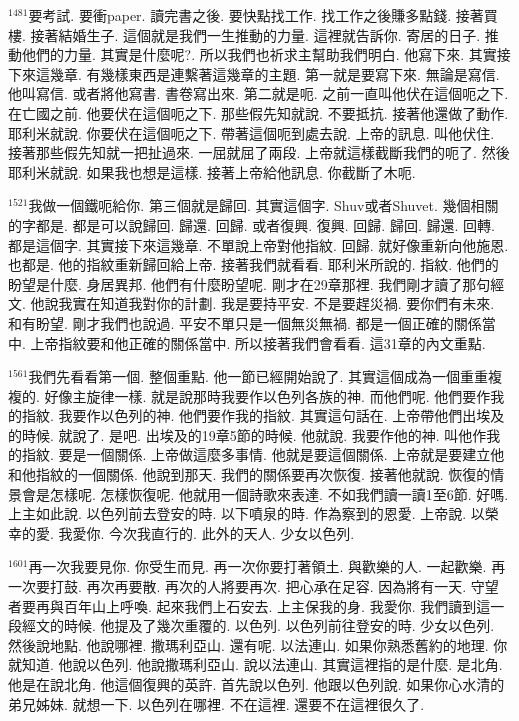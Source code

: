 \documentclass{book}
\begin{document}
$^{1481}$要考試.
要衝paper.
讀完書之後.
要快點找工作.
找工作之後賺多點錢.
接著買樓.
接著結婚生子.
這個就是我們一生推動的力量.
這裡就告訴你.
寄居的日子.
推動他們的力量.
其實是什麼呢?.
所以我們也祈求主幫助我們明白.
他寫下來.
其實接下來這幾章.
有幾樣東西是連繫著這幾章的主題.
第一就是要寫下來.
無論是寫信.
他叫寫信.
或者將他寫書.
書卷寫出來.
第二就是呃.
之前一直叫他伏在這個呃之下.
在亡國之前.
他要伏在這個呃之下.
那些假先知就說.
不要抵抗.
接著他還做了動作.
耶利米就說.
你要伏在這個呃之下.
帶著這個呃到處去說.
上帝的訊息.
叫他伏住.
接著那些假先知就一把扯過來.
一屈就屈了兩段.
上帝就這樣截斷我們的呃了.
然後耶利米就說.
如果我也想是這樣.
接著上帝給他訊息.
你截斷了木呃.

$^{1521}$我做一個鐵呃給你.
第三個就是歸回.
其實這個字.
Shuv或者Shuvet.
幾個相關的字都是.
都是可以說歸回.
歸還.
回歸.
或者復興.
復興.
回歸.
歸回.
歸還.
回轉.
都是這個字.
其實接下來這幾章.
不單說上帝對他指紋.
回歸.
就好像重新向他施恩.
也都是.
他的指紋重新歸回給上帝.
接著我們就看看.
耶利米所說的.
指紋.
他們的盼望是什麼.
身居異邦.
他們有什麼盼望呢.
剛才在29章那裡.
我們剛才讀了那句經文.
他說我實在知道我對你的計劃.
我是要持平安.
不是要趕災禍.
要你們有未來.
和有盼望.
剛才我們也說過.
平安不單只是一個無災無禍.
都是一個正確的關係當中.
上帝指紋要和他正確的關係當中.
所以接著我們會看看.
這31章的內文重點.

$^{1561}$我們先看看第一個.
整個重點.
他一節已經開始說了.
其實這個成為一個重重複複的.
好像主旋律一樣.
就是說那時我要作以色列各族的神.
而他們呢.
他們要作我的指紋.
我要作以色列的神.
他們要作我的指紋.
其實這句話在.
上帝帶他們出埃及的時候.
就說了.
是吧.
出埃及的19章5節的時候.
他就說.
我要作他的神.
叫他作我的指紋.
要是一個關係.
上帝做這麼多事情.
他就是要這個關係.
上帝就是要建立他和他指紋的一個關係.
他說到那天.
我們的關係要再次恢復.
接著他就說.
恢復的情景會是怎樣呢.
怎樣恢復呢.
他就用一個詩歌來表達.
不如我們讀一讀1至6節.
好嗎.
上主如此說.
以色列前去登安的時.
以下噴泉的時.
作為察到的恩愛.
上帝說.
以榮幸的愛.
我愛你.
今次我直行的.
此外的天人.
少女以色列.

$^{1601}$再一次我要見你.
你受生而見.
再一次你要打著領土.
與歡樂的人.
一起歡樂.
再一次要打鼓.
再次再要散.
再次的人將要再次.
把心承在足容.
因為將有一天.
守望者要再與百年山上呼喚.
起來我們上石安去.
上主保我的身.
我愛你.
我們讀到這一段經文的時候.
他提及了幾次重覆的.
以色列.
以色列前往登安的時.
少女以色列.
然後說地點.
他說哪裡.
撒瑪利亞山.
還有呢.
以法連山.
如果你熟悉舊約的地理.
你就知道.
他說以色列.
他說撒瑪利亞山.
說以法連山.
其實這裡指的是什麼.
是北角.
他是在說北角.
他這個復興的英許.
首先說以色列.
他跟以色列說.
如果你心水清的弟兄姊妹.
就想一下.
以色列在哪裡.
不在這裡.
還要不在這裡很久了.
\end{document}
